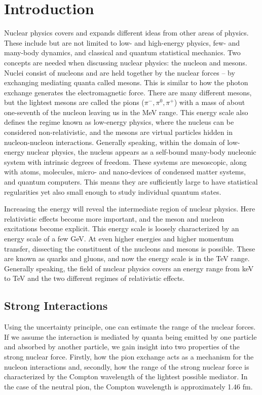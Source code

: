 \mainmatter
\chapter{Introduction}
Nuclear physics covers and expands different ideas from other areas of physics. These include but are not limited to low- and high-energy physics, few- and many-body dynamics, and classical and quantum statistical mechanics. Two concepts are needed when discussing nuclear physics: the nucleon and mesons. Nuclei consist of nucleons and are held together by the nuclear forces -- by exchanging mediating quanta called mesons. This is similar to how the photon exchange generates the electromagnetic force. There are many different mesons, but the lightest mesons are called the pions ($\pi^-,\pi^0,\pi^+$) with a mass of about one-seventh of the nucleon leaving us in the MeV range. This energy scale also defines the regime known as low-energy physics, where the nucleus can be considered non-relativistic, and the mesons are virtual particles hidden in nucleon-nucleon interactions.
Generally speaking, within the domain of low-energy nuclear physics, the nucleus appears as a self-bound many-body nucleonic system with intrinsic degrees of freedom. These systems are mesoscopic, along with atoms, molecules, micro- and nano-devices of condensed matter systems, and quantum computers. This means they are sufficiently large to have statistical regularities yet also small enough to study individual quantum states.

Increasing the energy will reveal the intermediate region of nuclear physics. Here relativistic effects become more important, and the meson and nucleon excitations become explicit. This energy scale is loosely characterized by an energy scale of a few GeV. At even higher energies and higher momentum transfer, dissecting the constituent of the nucleons and mesons is possible. These are known as quarks and gluons, and now the energy scale is in the TeV range. Generally speaking, the field of nuclear physics covers an energy range from keV to TeV and the two different regimes of relativistic effects. 
\section{Strong Interactions}
Using the uncertainty principle, one can estimate the range of the nuclear forces. If we assume the interaction is mediated by quanta being emitted by one particle and absorbed by another particle, we gain insight into two properties of the strong nuclear force. Firstly, how the pion exchange acts as a mechanism for the nucleon interactions and, secondly, how the range of the strong nuclear force is characterized by the Compton wavelength of the lightest possible mediator. In the case of the neutral pion, the Compton wavelength is approximately 1.46 fm. 
